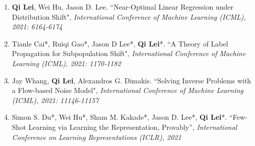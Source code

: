 \documentclass[margin, 10pt]{res} %
\begin{document}
\begin{resume}
\begin{enumerate}
	
\item{ \textbf{Qi Lei}, Wei Hu, Jason D. Lee.	
``Near-Optimal Linear Regression under Distribution Shift", \textit{ International Conference of Machine Learning (ICML), 2021: 6164-6174}
}	
\item{Tianle Cai*, Ruiqi Gao*, Jason D Lee*, \textbf{Qi Lei}*.  ``A Theory of Label Propagation for Subpopulation Shift", \textit{International Conference of Machine Learning (ICML), 2021: 1170-1182
} }
\item{Jay Whang, \textbf{Qi Lei}, Alexandros G. Dimakis. ``Solving Inverse Problems with a Flow-based Noise Model", \textit{International Conference of Machine Learning (ICML), 2021: 11146-11157
 }}
	\item{Simon S. Du*, Wei Hu*, Sham M. Kakade*, Jason D. Lee*, \textbf{Qi Lei}*. ``Few-Shot Learning via Learning the Representation, Provably'', \textit{International Conference on Learning Representations (ICLR), 2021} }
	

\end{enumerate}
\end{resume}
\end{document}
